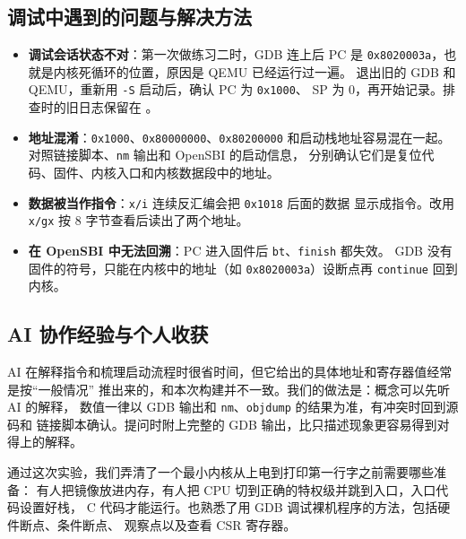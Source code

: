 \documentclass[UTF8,a4paper,10pt,fontset=none]{ctexart}
\begin{document}
\subsection{调试中遇到的问题与解决方法}
\begin{itemize}
    \item \textbf{调试会话状态不对}：第一次做练习二时，GDB 连上后 PC 是
          \texttt{0x8020003a}，也就是内核死循环的位置，原因是 QEMU 已经运行过一遍。
          退出旧的 GDB 和 QEMU，重新用 \texttt{-S} 启动后，确认 PC 为 \texttt{0x1000}、
          SP 为 0，再开始记录。排查时的旧日志保留在
          。
    \item \textbf{地址混淆}：\texttt{0x1000}、\texttt{0x80000000}、\texttt{0x80200000}
          和启动栈地址容易混在一起。对照链接脚本、\texttt{nm} 输出和 OpenSBI 的启动信息，
          分别确认它们是复位代码、固件、内核入口和内核数据段中的地址。
    \item \textbf{数据被当作指令}：\texttt{x/i} 连续反汇编会把 \texttt{0x1018} 后面的数据
          显示成指令。改用 \texttt{x/gx} 按 8 字节查看后读出了两个地址。
    \item \textbf{在 OpenSBI 中无法回溯}：PC 进入固件后 \texttt{bt}、\texttt{finish} 都失效。
          GDB 没有固件的符号，只能在内核中的地址（如 \texttt{0x8020003a}）设断点再 \texttt{continue} 回到内核。
\end{itemize}

\subsection{AI 协作经验与个人收获}
AI 在解释指令和梳理启动流程时很省时间，但它给出的具体地址和寄存器值经常是按“一般情况”
推出来的，和本次构建并不一致。我们的做法是：概念可以先听 AI 的解释，
数值一律以 GDB 输出和 \texttt{nm}、\texttt{objdump} 的结果为准，有冲突时回到源码和
链接脚本确认。提问时附上完整的 GDB 输出，比只描述现象更容易得到对得上的解释。

通过这次实验，我们弄清了一个最小内核从上电到打印第一行字之前需要哪些准备：
有人把镜像放进内存，有人把 CPU 切到正确的特权级并跳到入口，入口代码设置好栈，
C 代码才能运行。也熟悉了用 GDB 调试裸机程序的方法，包括硬件断点、条件断点、
观察点以及查看 CSR 寄存器。

\newpage

 
\end{document}
